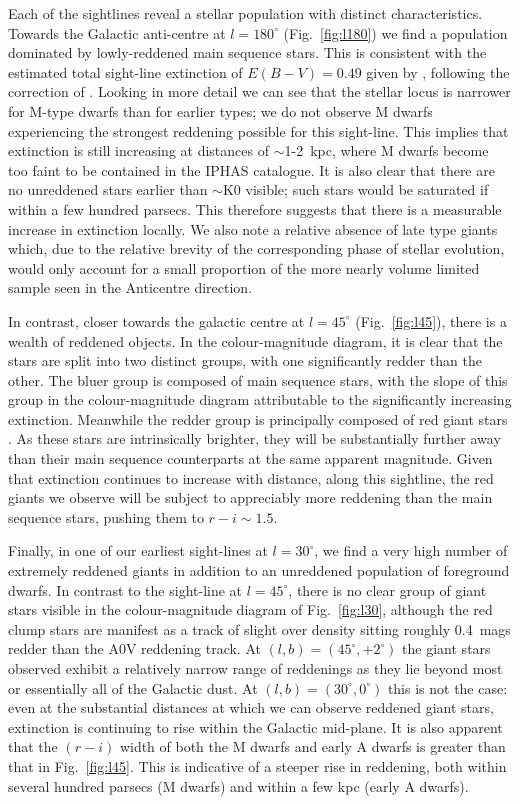 \documentclass[useAMS,usenatbib]{mn2e}
\begin{document}
Each of the sightlines reveal a stellar population
with distinct characteristics.
Towards the Galactic anti-centre 
at $l=180^\circ$ (Fig.~\ref{fig:l180})
we find a population dominated by lowly-reddened main sequence stars.
This is consistent with the estimated total sight-line extinction 
of $E(B-V)=0.49$ given by \cite{Schlegel1998},
following the correction of \cite{Schlafly2011}.
Looking in more detail we can see
that the stellar locus is narrower for M-type dwarfs
than for earlier types;
we do not observe M dwarfs experiencing 
the strongest reddening possible for this sight-line.
This implies that extinction is still increasing 
at distances of $\sim$1-2~kpc,
where M dwarfs become too faint to be contained in the IPHAS catalogue.
It is also clear that there are no unreddened stars
earlier than $\sim$K0 visible;
such stars would be saturated if within a few hundred parsecs.
This therefore suggests 
that there is a measurable increase in extinction locally.
We also note a relative absence of late type giants which,
due to the relative brevity 
of the corresponding phase of stellar evolution,
would only account for a small proportion of the more nearly volume 
limited sample seen in the Anticentre direction.
 
In contrast, 
closer towards the galactic centre
at $l=45^{\circ}$ (Fig.~\ref{fig:l45}),
there is  a wealth of reddened objects.
In the colour-magnitude diagram, it is clear
that the stars are split into two distinct groups,
with one significantly redder than the other.
The bluer group is composed of main sequence stars,
with the slope of this group in the colour-magnitude diagram
attributable to the significantly increasing extinction.
Meanwhile the redder group is principally composed of red giant stars \citep[see][]{Wright2008}.
As these stars are intrinsically brighter, they will be substantially 
further away than their main sequence counterparts at the same 
apparent magnitude.  Given that extinction continues to increase 
with distance, along this sightline, 
the red giants we observe will be subject to appreciably more reddening
than the main sequence stars, pushing them to $r - i \sim 1.5$.


Finally, in one of our earliest sight-lines at $l=30^{\circ}$,
we find a very high number of extremely reddened giants
in addition to an unreddened population
of foreground dwarfs.
In contrast to the sight-line at $l=45^{\circ}$,
there is no clear group of giant stars visible
in the colour-magnitude diagram of Fig.~\ref{fig:l30},
although the red clump stars are manifest as a track of slight 
over density sitting roughly 0.4~mags redder than the A0V reddening track.
At $(l,b)=(45^{\circ}, +2^{\circ})$ the giant stars observed
exhibit a relatively narrow range of reddenings
as they lie beyond most or essentially all of the Galactic dust.
At $(l,b)=(30^{\circ}, 0^{\circ})$ this is not the case:
even at the substantial distances
at which we can observe reddened giant stars,
extinction is continuing to rise within the Galactic mid-plane.
It is also apparent that the $(r-i)$ width of both the M dwarfs
and early A dwarfs is greater than that in Fig.~\ref{fig:l45}.
This is indicative of a steeper rise in reddening,
both within several hundred parsecs (M dwarfs)
and within a few kpc (early A dwarfs).
\end{document}
